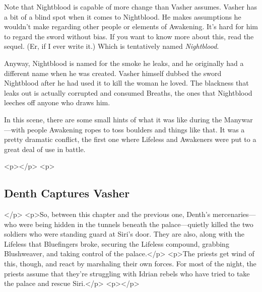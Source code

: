 Note that Nightblood is capable of more change than Vasher assumes. Vasher has a bit of a blind spot when it comes to Nightblood. He makes assumptions he wouldn’t make regarding other people or elements of Awakening. It’s hard for him to regard the sword without bias. If you want to know more about this, read the sequel. (Er, if I ever write it.) Which is tentatively named \textit{Nightblood}.

Anyway, Nightblood is named for the smoke he leaks, and he originally had a different name when he was created. Vasher himself dubbed the sword Nightblood after he had used it to kill the woman he loved. The blackness that leaks out is actually corrupted and consumed Breaths, the ones that Nightblood leeches off anyone who draws him.

In this scene, there are some small hints of what it was like during the Manywar—with people Awakening ropes to toss boulders and things like that. It was a pretty dramatic conflict, the first one where Lifeless and Awakeners were put to a great deal of use in battle.



<p></p>
<p>\subsection*{Denth Captures Vasher}</p>
<p>So, between this chapter and the previous one, Denth’s mercenaries—who were being hidden in the tunnels beneath the palace—quietly killed the two soldiers who were standing guard at Siri’s door. They are also, along with the Lifeless that Bluefingers broke, securing the Lifeless compound, grabbing Blushweaver, and taking control of the palace.</p>
<p>The priests get wind of this, though, and react by marshaling their own forces. For most of the night, the priests assume that they’re struggling with Idrian rebels who have tried to take the palace and rescue Siri.</p>
<p></p>



